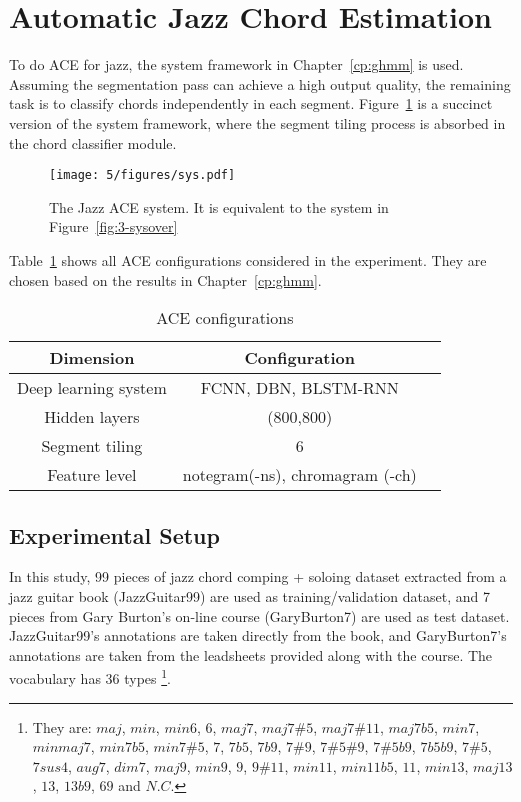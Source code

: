 \section{Automatic Jazz Chord Estimation} \label{sec:5-jazzace}
To do ACE for jazz, the system framework in Chapter~\ref{cp:ghmm} is used. Assuming the segmentation pass can achieve a high output quality, the remaining task is to classify chords independently in each segment. Figure~\ref{fig:5-jazzsys} is a succinct version of the system framework, where the segment tiling process is absorbed in the chord classifier module.
\begin{figure}[htb]
    \centering
        \texttt{[image: 5/figures/sys.pdf]}
    \caption{The Jazz ACE system. It is equivalent to the system in Figure~\ref{fig:3-sysover}}
    \label{fig:5-jazzsys}
\end{figure}

Table~\ref{tab:5-aceconfig} shows all ACE configurations considered in the experiment. They are chosen based on the results in Chapter~\ref{cp:ghmm}.
\begin{table}
\centering
\footnotesize
\begin{tabular}{|c|c|c|} \hline
Dimension & Configuration \\ \hline
Deep learning system & FCNN, DBN, BLSTM-RNN\\ \hline
Hidden layers & (800,800)\\ \hline
Segment tiling & 6\\ \hline
Feature level & notegram(-ns), chromagram (-ch) \\ \hline
\end{tabular}
\caption{ACE configurations}
\label{tab:5-aceconfig}
\end{table}

\subsection{Experimental Setup}
In this study, 99 pieces of jazz chord comping + soloing dataset extracted from a jazz guitar book \cite{jazzguitarbook} (JazzGuitar99) are used as training/validation dataset, and 7 pieces from Gary Burton's on-line course \cite{garyburtoncourse} (GaryBurton7) are used as test dataset. JazzGuitar99's annotations are taken directly from the book, and GaryBurton7's annotations are taken from the leadsheets provided along with the course. The vocabulary has 36 types \footnote{They are: $maj$, $min$, $min6$, $6$, $maj7$, $maj7\#5$, $maj7\#11$, $maj7b5$, $min7$, $minmaj7$, $min7b5$, $min7\#5$, $7$, $7b5$, $7b9$, $7\#9$, $7\#5\#9$, $7\#5b9$, $7b5b9$, $7\#5$, $7sus4$, $aug7$, $dim7$, $ maj9$, $min9$, $9$, $9\#11$, $min11$, $min11b5$, $11$, $min13$, $maj13$, $13$, $13b9$, $69$ and $N.C.$}.

